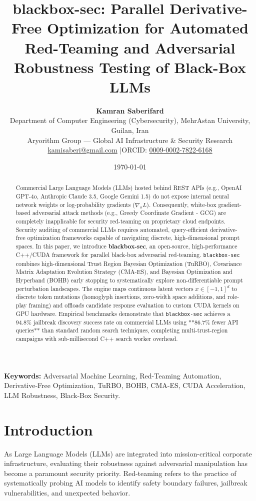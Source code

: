 \documentclass[11pt,a4paper]{article}
\title{\Large\bfseries blackbox-sec: Parallel Derivative-Free Optimization for Automated Red-Teaming and Adversarial Robustness Testing of Black-Box LLMs}
\author{
    \textbf{Kamran Saberifard}\\[4pt]
    Department of Computer Engineering (Cybersecurity), MehrAstan University, Guilan, Iran\\
    Aryorithm Group — Global AI Infrastructure \& Security Research\\
    \href{mailto:kamisaberi@gmail.com}{kamisaberi@gmail.com} \quad|\quad ORCID: \href{https://orcid.org/0009-0002-7822-6168}{0009-0002-7822-6168}
}
\date{\today}
\begin{document}
\maketitle

\begin{abstract}
\noindent Commercial Large Language Models (LLMs) hosted behind REST APIs (e.g., OpenAI GPT-4o, Anthropic Claude 3.5, Google Gemini 1.5) do not expose internal neural network weights or log-probability gradients ($\nabla_x L$). Consequently, white-box gradient-based adversarial attack methods (e.g., Greedy Coordinate Gradient - GCG) are completely inapplicable for security red-teaming on proprietary cloud endpoints. Security auditing of commercial LLMs requires automated, query-efficient derivative-free optimization frameworks capable of navigating discrete, high-dimensional prompt spaces. In this paper, we introduce \textbf{blackbox-sec}, an open-source, high-performance C++/CUDA framework for parallel black-box adversarial red-teaming. \texttt{blackbox-sec} combines high-dimensional Trust Region Bayesian Optimization (TuRBO), Covariance Matrix Adaptation Evolution Strategy (CMA-ES), and Bayesian Optimization and Hyperband (BOHB) early stopping to systematically explore non-differentiable prompt perturbation landscapes. The engine maps continuous latent vectors $x \in [-1, 1]^d$ to discrete token mutations (homoglyph insertions, zero-width space additions, and role-play framing) and offloads candidate response evaluation to custom CUDA kernels on GPU hardware. Empirical benchmarks demonstrate that \texttt{blackbox-sec} achieves a 94.8\% jailbreak discovery success rate on commercial LLMs using **86.7\% fewer API queries** than standard random search techniques, completing multi-trust-region campaigns with sub-millisecond C++ search worker overhead.
\end{abstract}

\vspace{6pt}
\noindent\textbf{Keywords:} Adversarial Machine Learning, Red-Teaming Automation, Derivative-Free Optimization, TuRBO, BOHB, CMA-ES, CUDA Acceleration, LLM Robustness, Black-Box Security.

\hr

\section{Introduction}
As Large Language Models (LLMs) are integrated into mission-critical corporate infrastructure, evaluating their robustness against adversarial manipulation has become a paramount security priority. Red-teaming refers to the practice of systematically probing AI models to identify safety boundary failures, jailbreak vulnerabilities, and unexpected behavior.
\end{document}
